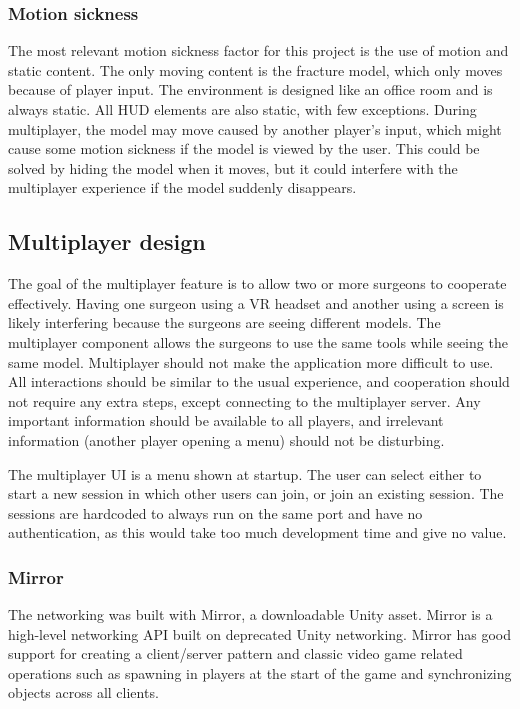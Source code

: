 \documentclass[a4paper]{report}
\begin{document}
\subsubsection{Motion sickness}
The most relevant motion sickness factor for this project is the use of motion and static content. The only moving content is the fracture model, which only moves because of player input. The environment is designed like an office room and is always static. All HUD elements are also static, with few exceptions.
During multiplayer, the model may move caused by another player's input, which might cause some motion sickness if the model is viewed by the user. This could be solved by hiding the model when it moves, but it could interfere with the multiplayer experience if the model suddenly disappears.

\subsection{Multiplayer design}
The goal of the multiplayer feature is to allow two or more surgeons to cooperate effectively. Having one surgeon using a VR headset and another using a screen is likely interfering because the surgeons are seeing different models. The multiplayer component allows the surgeons to use the same tools while seeing the same model.
Multiplayer should not make the application more difficult to use. All interactions should be similar to the usual experience, and cooperation should not require any extra steps, except connecting to the multiplayer server. Any important information should be available to all players, and irrelevant information (another player opening a menu) should not be disturbing.

The multiplayer UI is a menu shown at startup. The user can select either to start a new session in which other users can join, or join an existing session. The sessions are hardcoded to always run on the same port and have no authentication, as this would take too much development time and give no value.

\subsubsection{Mirror}
The networking was built with Mirror, a downloadable Unity asset. Mirror is a high-level networking API built on deprecated Unity networking\cite{noauthor_mirror_nodate}. Mirror has good support for creating a client/server pattern and classic video game related operations such as spawning in players at the start of the game and synchronizing objects across all clients.
\end{document}
